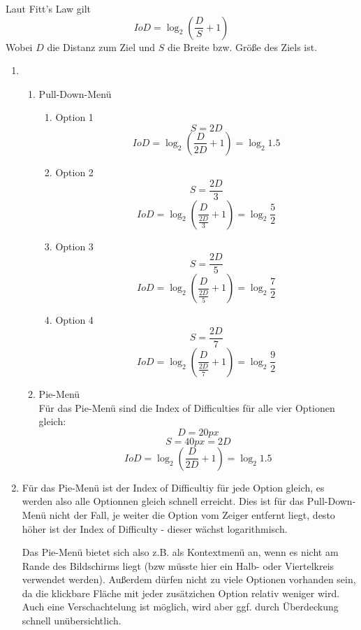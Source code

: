 \documentclass[a4paper,10pt]{article}
\begin{document}
\kopf
\renewcommand{\figurename}{Figure}

Laut Fitt's Law gilt
\[
	IoD = \log_2{\left(\frac{D}{S} + 1 \right)}
\]
Wobei $D$ die Distanz zum Ziel und $S$ die Breite bzw. Größe des Ziels ist.
\begin{enumerate}
	\item 
		\begin{enumerate}
			\item Pull-Down-Menü
			\begin{enumerate}
				\item Option 1
				 	\[ S = 2D \]
					\[ IoD = \log_2{\left(\frac{D}{2D} + 1 \right) = \log_2{1.5}}\]
				\item Option 2
				    \[ S = \frac{2D}{3} \]	
				    \[ IoD = \log_2{\left(\frac{D}{\frac{2D}{3}} + 1 \right)} = \log_2{\frac{5}{2}} \]
				\item Option 3
					\[ S = \frac{2D}{5} \]
					\[ IoD = \log_2{\left(\frac{D}{\frac{2D}{5}} + 1 \right)} = \log_2{\frac{7}{2}} \]
				\item Option 4
					\[ S = \frac{2D}{7} \]
					\[ IoD = \log_2{\left(\frac{D}{\frac{2D}{7}} + 1 \right)} = \log_2{\frac{9}{2}} \]
			\end{enumerate}
				
			\item Pie-Menü\\
				Für das Pie-Menü sind die Index of Difficulties für alle vier Optionen gleich:
				\[ D = 20px \]
				\[ S = 40px = 2D \]
				\[ IoD = \log_2{\left(\frac{D}{2D} + 1 \right) = \log_2{1.5}}\]
				
			
		\end{enumerate}
	\item
		Für das Pie-Menü ist der Index of Difficultiy für jede Option gleich, es werden also alle Optionnen gleich schnell erreicht.
		Dies ist für das Pull-Down-Menü nicht der Fall, je weiter die Option vom Zeiger entfernt liegt, desto höher ist der Index of Difficulty - dieser wächst logarithmisch. 
		
		Das Pie-Menü bietet sich also z.B. als Kontextmenü an, wenn es nicht am Rande des Bildschirms liegt (bzw müsste hier ein Halb- oder Viertelkreis verwendet werden).
		Außerdem dürfen nicht zu viele Optionen vorhanden sein, da die klickbare Fläche mit jeder zusätzichen Option relativ weniger wird.
		Auch eine Verschachtelung ist möglich, wird aber ggf. durch Überdeckung schnell unübersichtlich.
\end{enumerate}
\end{document}
